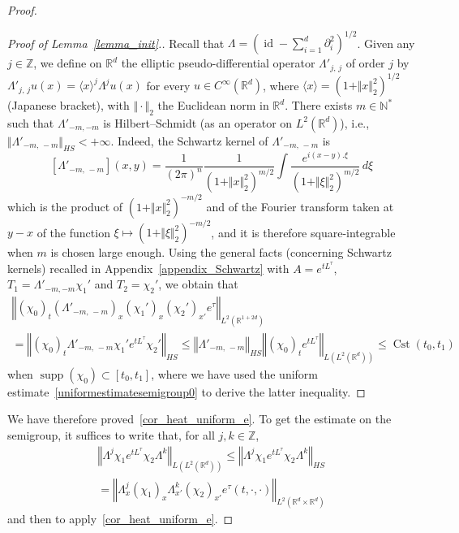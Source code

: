 \documentclass[AHL,Unicode,published]{cedram}
\newcommand*\R{\mathbb{R}}
\newcommand*\N{\mathbb{N}}
\newcommand*\Z{\mathbb{Z}}
\DeclareMathOperator{\supp}{supp}
\DeclareMathOperator{\Cst}{Cst}
\DeclareMathOperator{\id}{id}
\renewcommand{\leq}{\leqslant}
\begin{document}
\begin{proof}
\begin{proof}[Proof of Lemma~\ref{lemma_init}.]
Recall that $\Lambda = (\id-\sum_{i=1}^d\partial_i^2)^{1/2}$. Given any $j\in\Z$, we define on $\R^d$ the elliptic pseudo-differential operator $\Lambda'_{j,\,j}$ of order $j$ by $\Lambda'_{j,\,j} u(x) = \langle x\rangle^j \Lambda^j u(x)$ for every $u\in C^\infty(\R^d)$, where $\langle x\rangle = (1+\Vert x\Vert_2^2)^{1/2}$ (Japanese bracket), with $\Vert\cdot\Vert_2$ the Euclidean norm in $\R^d$. There exists $m\in\N^*$ such that $\Lambda'_{-m,-m}$ is Hilbert--Schmidt (as an operator on $L^2(\R^d)$), i.e., $\Vert \Lambda'_{-m,\,-m} \Vert_{HS}<+\infty$. Indeed, the Schwartz kernel of $\Lambda'_{-m,\,-m}$ is
\[
\left[\Lambda'_{-m,\,-m}\right](x,y) = \frac{1}{(2\pi)^n}\frac{1}{(1+\Vert x\Vert_2^2)^{m/2}} \int \frac{e^{i(x-y).\xi}}{(1+\Vert \xi\Vert_2^2)^{m/2}}\, d\xi
\]
which is the product of $(1+\Vert x\Vert_2^2)^{-m/2}$ and of the Fourier transform taken at $y-x$ of the function $\xi\mapsto (1+\Vert \xi\Vert_2^2)^{-m/2}$, and it is therefore square-integrable when $m$ is chosen large enough. Using the general facts (concerning Schwartz kernels) recalled in Appendix~\ref{appendix_Schwartz} with $A = e^{t L^\tau}$, $T_1=\Lambda'_{-m,-m} \chi_1'$ and $T_2 = \chi_2'$, we obtain that
\begin{multline*}
\left\Vert (\chi_0)_t(\Lambda'_{-m,\,-m})_x(\chi_1')_x(\chi_2')_{x'}e^\tau \right\Vert_{L^2\left(\R^{1+2d}\right)} \\= \left\Vert (\chi_0)_t \Lambda'_{-m,\,-m} \chi_1' e^{tL^\tau}\chi_2' \right\Vert_{HS}
\leq \left\Vert \Lambda'_{-m,\,-m} \right\Vert_{HS} \left\Vert (\chi_0)_t e^{t L^\tau}\right\Vert_{L\left(L^2\left(\R^d\right)\right)}
\leq \Cst(t_0,t_1)
\end{multline*}
when $\supp(\chi_0)\subset[t_0,t_1]$, where we have used the uniform estimate~\eqref{uniformestimatesemigroup0} to derive the latter inequality.
\end{proof}

We have therefore proved~\eqref{cor_heat_uniform_e}. To get the estimate on the semigroup, it suffices to write that, for all $j,k\in\Z$,
\begin{multline*}
\left\Vert \Lambda^j \chi_1 e^{tL^\tau}\chi_2\Lambda^k\right\Vert_{L\left(L^2\left(\R^d\right)\right)} \leq \left\Vert \Lambda^j \chi_1 e^{tL^\tau}\chi_2\Lambda^k\right\Vert_{HS}\\
= \left\Vert \Lambda^j_x(\chi_1)_x \Lambda^k_{x'} (\chi_2)_{x'} e^\tau(t,\cdot,\cdot)\right\Vert_{L^2\left(\R^d\times\R^d\right)}
\end{multline*}
and then to apply~\eqref{cor_heat_uniform_e}.
\end{proof}
\end{document}
